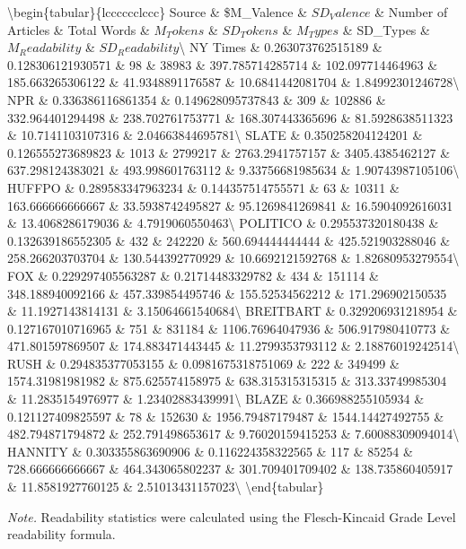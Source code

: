 \documentclass[english,,man]{apa6}
\begin{document}
\textbackslash{}begin\{tabular\}\{lcccccclccc\}
\toprule
Source \& \$M\_Valence \& \(SD_Valence\) \& Number of Articles \& Total Words \& \(M_Tokens\) \& \(SD_Tokens\) \& \(M_Types\) \& SD\_Types \& \(M_Readability\) \& \(SD_Readability\)\textbackslash{}
\midrule
NY Times \& 0.263073762515189 \& 0.128306121930571 \& 98 \& 38983 \& 397.785714285714 \& 102.097714464963 \& 185.663265306122 \& 41.9348891176587 \& 10.6841442081704 \& 1.84992301246728\textbackslash{}
NPR \& 0.336386116861354 \& 0.149628095737843 \& 309 \& 102886 \& 332.964401294498 \& 238.702761753771 \& 168.307443365696 \& 81.5928638511323 \& 10.7141103107316 \& 2.04663844695781\textbackslash{}
SLATE \& 0.350258204124201 \& 0.126555273689823 \& 1013 \& 2799217 \& 2763.2941757157 \& 3405.4385462127 \& 637.298124383021 \& 493.998601763112 \& 9.33756681985634 \& 1.90743987105106\textbackslash{}
HUFFPO \& 0.289583347963234 \& 0.144357514755571 \& 63 \& 10311 \& 163.666666666667 \& 33.5938742495827 \& 95.1269841269841 \& 16.5904092616031 \& 13.4068286179036 \& 4.7919060550463\textbackslash{}
POLITICO \& 0.295537320180438 \& 0.132639186552305 \& 432 \& 242220 \& 560.694444444444 \& 425.521903288046 \& 258.266203703704 \& 130.544392770929 \& 10.6692121592768 \& 1.82680953279554\textbackslash{}
FOX \& 0.229297405563287 \& 0.21714483329782 \& 434 \& 151114 \& 348.188940092166 \& 457.339854495746 \& 155.52534562212 \& 171.296902150535 \& 11.1927143814131 \& 3.15064661540684\textbackslash{}
BREITBART \& 0.329206931218954 \& 0.127167010716965 \& 751 \& 831184 \& 1106.76964047936 \& 506.917980410773 \& 471.801597869507 \& 174.883471443445 \& 11.2799353793112 \& 2.18876019242514\textbackslash{}
RUSH \& 0.294835377053155 \& 0.0981675318751069 \& 222 \& 349499 \& 1574.31981981982 \& 875.625574158975 \& 638.315315315315 \& 313.33749985304 \& 11.2835154976977 \& 1.23402883439991\textbackslash{}
BLAZE \& 0.366988255105934 \& 0.121127409825597 \& 78 \& 152630 \& 1956.79487179487 \& 1544.14427492755 \& 482.794871794872 \& 252.791498653617 \& 9.76020159415253 \& 7.60088309094014\textbackslash{}
HANNITY \& 0.303355863690906 \& 0.116224358322565 \& 117 \& 85254 \& 728.666666666667 \& 464.343065802237 \& 301.709401709402 \& 138.735860405917 \& 11.8581927760125 \& 2.51013431157023\textbackslash{}
\bottomrule
\addlinespace
\textbackslash{}end\{tabular\}

\begin{tablenotes}[para]
\normalsize{\textit{Note.} Readability statistics were calculated using the Flesch-Kincaid Grade Level readability formula.}
\end{tablenotes}
\end{document}
